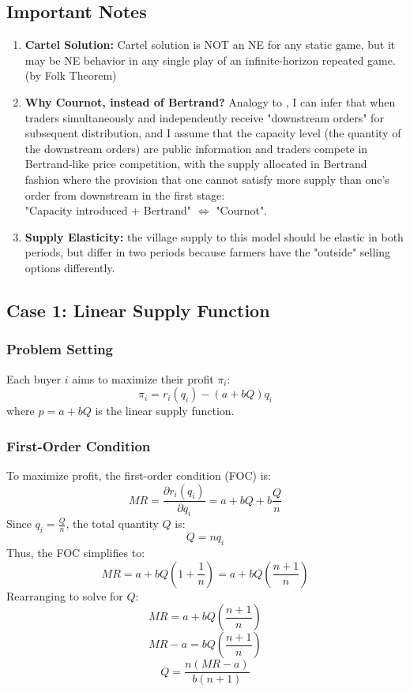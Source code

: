 \documentclass[12pt]{article}
\begin{document}
\subsection{Important Notes}
\begin{enumerate}
    \item \textbf{Cartel Solution:} Cartel solution is NOT an NE for any static game, but it may be NE behavior in any single play of an infinite-horizon repeated game. (by Folk Theorem)
    
    \item \textbf{Why Cournot, instead of Bertrand?} Analogy to \cite{kreps1983quantity}, I can infer that when traders simultaneously and independently receive "downstream orders" for subsequent distribution, and I assume that the capacity level (the quantity of the downstream orders) are public information and traders compete in Bertrand-like price competition, with the supply allocated in Bertrand fashion where the provision that one cannot satisfy more supply than one's order from downstream in the first stage: \\
    "Capacity introduced + Bertrand" $\Longleftrightarrow$ "Cournot".

    \item \textbf{Supply Elasticity:} the village supply to this model should be elastic in both periods, but differ in two periods because farmers have the "outside" selling options differently. 
\end{enumerate}


\subsection{Case 1: Linear Supply Function}

\subsubsection*{Problem Setting}

Each buyer \( i \) aims to maximize their profit \( \pi_i \):
\[
\pi_i = r_i(q_i) - (a + bQ)q_i
\]
where \( p = a + bQ \) is the linear supply function.

\subsubsection*{First-Order Condition}

To maximize profit, the first-order condition (FOC) is:
\[
MR = \frac{\partial r_i(q_i)}{\partial q_i} = a + bQ + b \frac{Q}{n}
\]
Since \( q_i = \frac{Q}{n} \), the total quantity \( Q \) is:
\[
Q = nq_i
\]
Thus, the FOC simplifies to:
\[
MR = a + bQ \left(1 + \frac{1}{n}\right) = a + bQ \left(\frac{n+1}{n}\right)
\]
Rearranging to solve for \( Q \):
\[
MR = a + bQ \left(\frac{n+1}{n}\right)
\]
\[
MR - a = bQ \left(\frac{n+1}{n}\right)
\]
\[
Q = \frac{n(MR - a)}{b(n+1)}
\]
\end{document}
